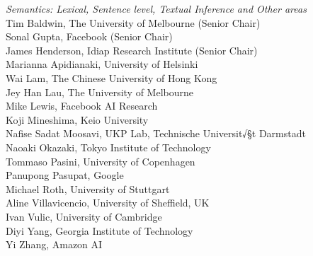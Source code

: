 \emph{Semantics: Lexical, Sentence level, Textual Inference and Other areas} \\
\hspace*{0.2in} Tim Baldwin, The University of Melbourne (Senior Chair)\\
\hspace*{0.2in} Sonal Gupta, Facebook (Senior Chair)\\
\hspace*{0.2in} James Henderson, Idiap Research Institute (Senior Chair)\\
\hspace*{0.2in} Marianna Apidianaki, University of Helsinki\\
\hspace*{0.2in} Wai Lam, The Chinese University of Hong Kong\\
\hspace*{0.2in} Jey Han Lau, The University of Melbourne\\
\hspace*{0.2in} Mike Lewis, Facebook AI Research\\
\hspace*{0.2in} Koji Mineshima, Keio University\\
\hspace*{0.2in} Nafise Sadat Moosavi, UKP Lab, Technische Universit√§t Darmstadt\\
\hspace*{0.2in} Naoaki Okazaki, Tokyo Institute of Technology\\
\hspace*{0.2in} Tommaso Pasini, University of Copenhagen\\
\hspace*{0.2in} Panupong Pasupat, Google\\
\hspace*{0.2in} Michael Roth, University of Stuttgart\\
\hspace*{0.2in} Aline Villavicencio, University of Sheffield, UK\\
\hspace*{0.2in} Ivan Vulic, University of Cambridge\\
\hspace*{0.2in} Diyi Yang, Georgia Institute of Technology\\
\hspace*{0.2in} Yi Zhang, Amazon AI\\

